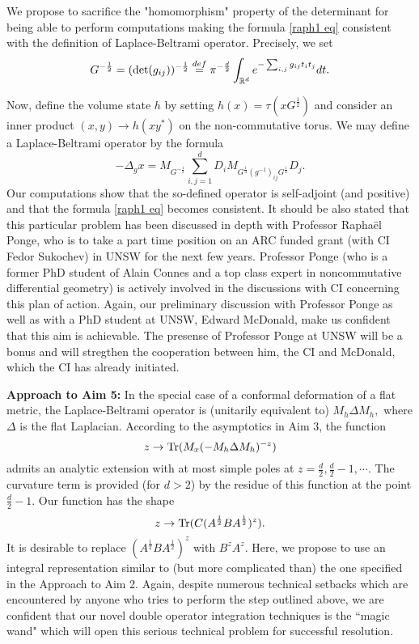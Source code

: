 \documentclass[12pt]{article}
\begin{document}
We propose to sacrifice the "homomorphism" property of the determinant for being able to perform computations making the formula \eqref{raph1 eq} consistent with the definition of Laplace-Beltrami operator. Precisely, we set 
$$G^{-\frac12}=({\rm det}(g_{ij}))^{-\frac12}\stackrel{def}{=}\pi^{-\frac{d}{2}}\int_{\mathbb{R}^d}e^{-\sum_{i,j}g_{ij}t_it_j}dt.$$

Now, define the volume state $h$ by setting $h(x)=\tau(xG^{\frac12})$ and consider an inner product $(x,y)\to h(xy^*)$ on the non-commutative torus. We may define a Laplace-Beltrami operator by the formula
$$-\Delta_g x=M_{G^{-\frac12}}\sum_{i,j=1}^dD_iM_{G^{\frac14}(g^{-1})_{ij}G^{\frac14}}D_j.$$
Our computations show that the so-defined operator is self-adjoint (and positive) and that the formula \eqref{raph1 eq} becomes consistent. It should be also stated that this particular problem has been discussed in depth with Professor Rapha\"el Ponge, who is to take a part time position on an ARC funded grant (with CI Fedor Sukochev) in UNSW for the next few years. Professor Ponge (who is a former PhD student of Alain Connes and a top class expert in noncommutative differential geometry) is actively involved in the discussions with CI concerning this plan of action. Again, our preliminary discussion with Professor Ponge as well as with a PhD student at UNSW, Edward McDonald, make us confident that this aim is achievable. The presense of Professor Ponge at UNSW will be a bonus and will stregthen the cooperation between him, the CI and McDonald, which the CI has already initiated.

{\bf Approach to Aim 5:} In the special case of a conformal deformation of a flat metric, the Laplace-Beltrami operator is (unitarily equivalent to) $M_h\Delta M_h,$ where $\Delta$ is the flat Laplacian. According to the asymptotics in Aim 3, the function
$$z\to {\rm Tr}(M_x(-M_h\Delta M_h)^{-z})$$
admits an analytic extension with at most simple poles at $z=\frac{d}{2},\frac{d}{2}-1,\cdots.$ The curvature term is provided (for $d>2$) by the residue of this function at the point $\frac{d}{2}-1.$ Our function has the shape
$$z\to {\rm Tr}(C(A^{\frac12}BA^{\frac12})^z).$$
It is desirable to replace $(A^{\frac12}BA^{\frac12})^z$ with $B^zA^z.$ Here, we propose to use an integral representation similar to (but more complicated than) the one specified in  the Approach to Aim 2. Again, despite numerous technical setbacks which are encountered by anyone who tries to perform the step outlined above, we are confident that our novel double operator integration techniques is the ``magic wand" which will open this serious technical problem for successful resolution.
\end{document}
